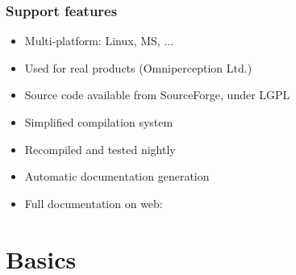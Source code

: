 \documentclass[landscape]{beamer}
\begin{document}
\begin{frame}  \frametitle{Support features}

  \begin{itemize}
  \item Multi-platform:  Linux, MS, ...

  \pause\item Used for real products (Omniperception Ltd.)

  \pause\item Source code available from SourceForge, under LGPL

  \pause\item Simplified compilation system

  \pause\item Recompiled and tested nightly

  \pause\item Automatic documentation generation
    
  \pause\item Full documentation on web: 

  \pause

  \end{itemize}

\end{frame}




\section{Basics}
\end{document}
